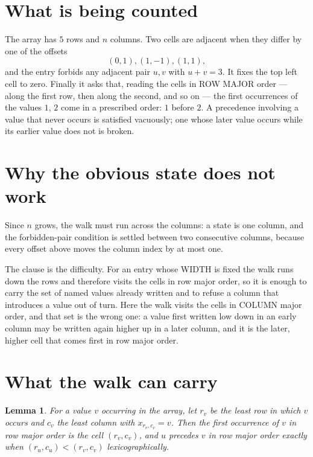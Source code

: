 \documentclass[11pt,a4paper]{article}
\theoremstyle{plain}
\newtheorem{lemma}[theorem]{Lemma}
\theoremstyle{definition}
\begin{document}
\section{What is being counted}

The array has $5$ rows and $n$ columns. Two cells are adjacent when they differ by one of the
offsets
\[
(0,1), (1,-1), (1,1),
\]
and the entry forbids any adjacent pair $u,v$ with $u+v=3$. It fixes the top left cell to
zero. Finally it asks that, reading the cells in ROW MAJOR order --- along the first row, then
along the second, and so on --- the first occurrences of the values $1$, $2$ come in a
prescribed order: $1$ before $2$. A precedence involving a value that never occurs is satisfied
vacuously; one whose later value occurs while its earlier value does not is broken.

\section{Why the obvious state does not work}

Since $n$ grows, the walk must run across the columns: a state is one column, and the
forbidden-pair condition is settled between two consecutive columns, because every offset above
moves the column index by at most one.

The clause is the difficulty. For an entry whose WIDTH is fixed the walk runs down the rows and
therefore visits the cells in row major order, so it is enough to carry the set of named values
already written and to refuse a column that introduces a value out of turn. Here the walk
visits the cells in COLUMN major order, and that set is the wrong one: a value first written
low down in an early column may be written again higher up in a later column, and it is the
later, higher cell that comes first in row major order.

\section{What the walk can carry}

\begin{lemma}\label{lem:key}
For a value $v$ occurring in the array, let $r_v$ be the least row in which $v$ occurs and
$c_v$ the least column with $x_{r_v,c_v}=v$. Then the first occurrence of $v$ in row major
order is the cell $(r_v,c_v)$, and $u$ precedes $v$ in row major order exactly when
$(r_u,c_u)<(r_v,c_v)$ lexicographically.
\end{lemma}
\end{document}
